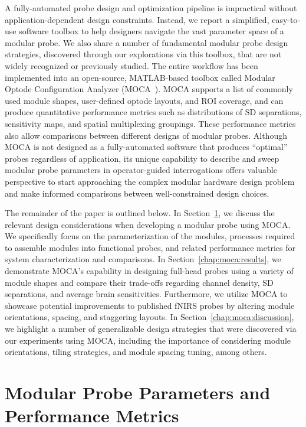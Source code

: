A fully-automated probe design and optimization pipeline is impractical without application-dependent design constraints. Instead, we report a simplified, easy-to-use software toolbox to help designers navigate the vast parameter space of a modular probe. We also share a number of fundamental modular probe design strategies, discovered through our explorations via this toolbox, that are not widely recognized or previously studied. The entire workflow has been implemented into an open-source, MATLAB-based toolbox called Modular Optode Configuration Analyzer (MOCA~\cite{Vanegas2020}). \ac{MOCA} supports a list of commonly used module shapes, user-defined optode layouts, and \ac{ROI} coverage, and can produce quantitative performance metrics such as distributions of \ac{SD} separations, sensitivity maps, and spatial multiplexing groupings. These performance metrics also allow comparisons between different designs of modular probes. Although \ac{MOCA} is not designed as a fully-automated software that produces ``optimal'' probes regardless of application, its unique capability to describe and sweep modular probe parameters in operator-guided interrogations offers valuable perspective to start approaching the complex modular hardware design problem and make informed comparisons between well-constrained design choices.

The remainder of the paper is outlined below. In Section~\ref{chap:moca:overview}, we discuss the relevant design considerations when developing a modular probe using \ac{MOCA}. We specifically focus on the parameterization of the modules, processes required to assemble modules into functional probes, and related performance metrics for system characterization and comparisons. In Section~\ref{chap:moca:results}, we demonstrate \ac{MOCA}'s capability in designing full-head probes using a variety of module shapes and compare their trade-offs regarding channel density, \ac{SD} separations, and average brain sensitivities. Furthermore, we utilize \ac{MOCA} to showcase potential improvements to published \ac{fNIRS} probes by altering module orientations, spacing, and staggering layouts. In Section~\ref{chap:moca:discussion}, we highlight a number of generalizable design strategies that were discovered via our experiments using \ac{MOCA}, including the importance of considering module orientations, tiling strategies, and module spacing tuning, among others.



\section{Modular Probe Parameters and Performance Metrics}
\label{chap:moca:overview}

